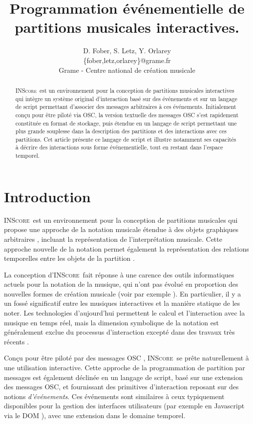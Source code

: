 \documentclass{article}
\title{Programmation événementielle de partitions musicales interactives.}
\author{D. Fober, S. Letz, Y. Orlarey\\
{\small \{fober,letz,orlarey\}@grame.fr}\\
Grame - Centre national de création musicale
}
\newcommand{\inscore}		{\textsc{\small INScore}}
\begin{document}
%
\maketitle
%
\begin{abstract}
\inscore\ est un environnement pour la conception de partitions musicales interactives qui intègre un système original d'interaction basé sur des événements et sur un langage de script permettant d'associer des messages arbitraires à ces événements. Initialement conçu pour être piloté via OSC, la version textuelle des messages OSC s'est rapidement constituée en format de stockage, puis étendue en un langage de script permettant une plus grande souplesse dans la description des partitions et des interactions avec ces partitions. Cet article présente ce langage de script et illustre notamment ses capacités à décrire des interactions sous forme événementielle, tout en restant dans l'espace temporel.
\end{abstract}
%

\section{Introduction}\label{sec:introduction}

\inscore\ est un environnement pour la conception de partitions musicales qui propose une approche de la notation musicale étendue à des objets graphiques arbitraires \cite{Fober:10c}, incluant la représentation de l'interprétation musicale. Cette approche nouvelle de la notation permet également la représentation des relations temporelles entre les objets de la partition \cite{fober:10b}.

La conception d'\inscore\ fait réponse à une carence des outils informatiques actuels pour la notation de la musique, qui n'ont pas évolué en proportion des nouvelles formes de création musicale (voir par exemple \cite{magnuss11} \cite{freeman11}). 
En particulier, il y a un fossé significatif entre les musiques interactives et la manière statique de les noter.
Les technologies d'aujourd'hui permettent le calcul et l'interaction avec la musique en temps réel, mais la dimension symbolique de la notation est généralement exclue du processus d'interaction excepté dans des travaux très récents \cite{Hoadley12}.

Conçu pour être piloté par des messages OSC \cite{OSC}, \inscore\ se prête naturellement à une utilisation interactive. Cette approche de la programmation de partition par messages est également déclinée en un langage de script, basé sur une extension des messages OSC, et fournissant des primitives d'interaction reposant sur des notions \emph{d'événements}. Ces événements sont similaires à ceux typiquement disponibles pour la gestion des interfaces utilisateurs (par exemple en Javascript via le DOM \cite{dom3ev}), avec une extension dans le domaine temporel.
\end{document}
